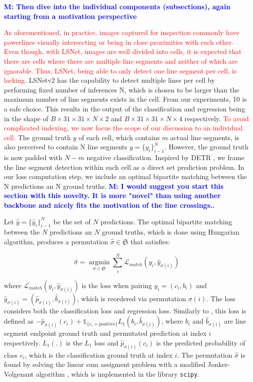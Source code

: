 \documentclass[journal]{IEEEtran}
\newcommand{\commentM}[1]{\textbf{\textcolor{blue}{M: #1}}}
\begin{document}
\commentM{Then dive into the individual components (subsections), again starting from a motivation perspective}

\textcolor{red}{As aforementioned, in practice, images captured for inspection commonly have powerlines visually intersecting or being in close proximities with each other. Even though, with LSNet, images are well divided into cells, it is expected that there are cells where there are multiple line segments and neither of which are ignorable. Thus, LSNet, being able to only detect one line segment per cell, is lacking}. LSNetv2 has the capability to detect multiple lines per cell by performing fixed number of inferences N, which is chosen to be larger than the maximum number of line segments exists in the cell. From our experiments, 10 is a safe choice. This results in the output of the classification and regression being in the shape of $B \times 31 \times 31 \times N \times 2$ and $B \times 31 \times 31 \times N \times 4$ respectively. \textcolor{red}{To avoid complicated indexing, we now focus the scope of our discussion to an individual cell.} The ground truth $y$ of each cell, which contains $m$ actual line segments, is also perceived to contain N line segments $y=\{y_i\}^N_{i-1}$. However, the ground truth is now padded with $N-m$ negative classification. Inspired by DETR \cite{DETR}, we frame the line segment detection within each cell as a direct set prediction problem. In our loss computation step, we include an optimal bipartite matching between the N predictions an N ground truths. \commentM{I would suggest you start this section with this novelty. It is more "novel" than using another backbone and nicely fits the motivation of the line crossings..}

Let $\hat{y}=\{\hat{y}_i\}^N_{i-1}$ be the set of $N$ predictions. The optimal bipartite matching between the $N$ predictions an $N$ ground truths, which is done using Hungarian algorithm, produces a permutation $\hat{\sigma} \in \mathfrak{S}$ that satisfies:

\begin{equation} \label{bipartite_eqn}
\hat{\sigma} = \mathop{\arg \min}\limits_{\sigma \in \mathfrak{S}} \sum_i^N \mathcal{L}_{match} (y_i, \hat{y}_{\sigma(i)})
\end{equation}

where $\mathcal{L}_{match} (y_i, \hat{y}_{\sigma(i)})$ is the loss when pairing $y_i = (c_i, b_i)$ and $\hat{y}_{\sigma(i)} = (\hat{p}_{\sigma(i)}, \hat{b}_{\sigma(i)})$, which is reordered via permutation $\sigma(i)$. The loss considers both the classification loss and regression loss. Similarly to \cite{DETR}, this loss is defined as $-\hat{p}_{\sigma(i)}(c_i) + \mathds{1}_{\{c_i=\text{positive}\}}L_1(b_i, \hat{b}_{\sigma(i)})$, where $b_i$ and $\hat{b}_{\sigma(i)}$ are line segment endpoint ground truth and permutated prediction at index $i$ respectively. $L_1(.)$ is the $L_1$ loss and $\hat{p}_{\sigma(i)}(c_i)$ is the predicted probability of class $c_i$, which is the classification ground truth at index $i$. The permutation $\hat{\sigma}$ is found by solving the linear sum assigment problem with a modified Jonker-Volgenant algorithm \cite{7738348}, which is implemented in the library \texttt{scipy}.
\end{document}
